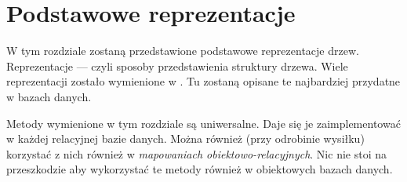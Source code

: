 \chapter{Podstawowe reprezentacje}

W tym rozdziale zostaną przedstawione podstawowe reprezentacje drzew.
Reprezentacje --- czyli sposoby przedstawienia struktury drzewa.
Wiele reprezentacji zostało wymienione w \cite{knuth}.
Tu zostaną opisane te najbardziej przydatne w bazach danych.




Metody wymienione w tym rozdziale są uniwersalne.
Daje się je zaimplementować w każdej relacyjnej bazie danych. 
Można również (przy odrobinie wysiłku) korzystać z nich również w \emph{mapowaniach obiektowo-relacyjnych}.
Nic nie stoi na przeszkodzie aby wykorzystać te metody również w obiektowych bazach danych.

